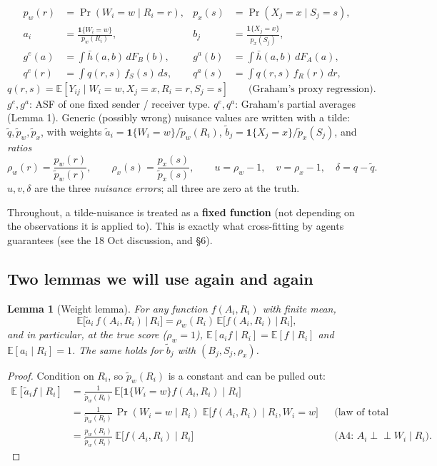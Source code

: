 \documentclass[11pt,a4paper]{article}
\newtheorem{lemma}{Lemma}
\theoremstyle{remark}
\newcommand{\E}{\mathbb{E}}
\newcommand{\1}{\mathbf{1}}
\newcommand{\ind}{\perp\!\!\!\perp}
\newcommand{\qe}{q^{e}}
\newcommand{\qa}{q^{a}}
\newcommand{\gE}{g^{e}}
\newcommand{\gA}{g^{a}}
\begin{document}
\begin{setupbox}
\begin{align*}
  p_w(r)&=\Pr(W_i=w\mid R_i=r), & p_x(s)&=\Pr(X_j=x\mid S_j=s), \\
  a_i&=\frac{\1\{W_i=w\}}{p_w(R_i)}, & b_j&=\frac{\1\{X_j=x\}}{p_x(S_j)},\\
  \gE(a)&=\int \bar h(a,b)\,dF_B(b), & \gA(b)&=\int \bar h(a,b)\,dF_A(a),\\
  \qe(r)&=\int q(r,s)\,f_S(s)\,ds, & \qa(s)&=\int q(r,s)\,f_R(r)\,dr,
\end{align*}
\[
q(r,s)=\E[Y_{ij}\mid W_i=w,X_j=x,R_i=r,S_j=s]\qquad\text{(Graham's proxy regression).}
\]
$\gE,\gA$: ASF of one fixed sender / receiver type. $\qe,\qa$: Graham's partial averages (Lemma 1).
Generic (possibly wrong) nuisance values are written with a tilde: $\tilde q,\tilde p_w,\tilde p_x$, with weights
$\tilde a_i=\1\{W_i=w\}/\tilde p_w(R_i)$, $\tilde b_j=\1\{X_j=x\}/\tilde p_x(S_j)$, and \emph{ratios}
\[
\rho_w(r)=\frac{p_w(r)}{\tilde p_w(r)},\qquad \rho_x(s)=\frac{p_x(s)}{\tilde p_x(s)},\qquad
u=\rho_w-1,\quad v=\rho_x-1,\quad \delta=q-\tilde q .
\]
$u,v,\delta$ are the three \emph{nuisance errors}; all three are zero at the truth.
\end{setupbox}

\noindent Throughout, a tilde-nuisance is treated as a \textbf{fixed function} (not depending on the observations it is applied to). This is exactly what cross-fitting by agents guarantees (see the 18 Oct discussion, and \S6).

\subsection*{Two lemmas we will use again and again}

\begin{lemma}[Weight lemma]\label{lem:weight}
For any function $f(A_i,R_i)$ with finite mean,
\[
\E\big[\tilde a_i\, f(A_i,R_i)\,\big|\,R_i\big]=\rho_w(R_i)\,\E\big[f(A_i,R_i)\,\big|\,R_i\big],
\]
and in particular, at the true score ($\rho_w=1$), $\E[a_i f\mid R_i]=\E[f\mid R_i]$ and $\E[a_i\mid R_i]=1$. The same holds for $\tilde b_j$ with $(B_j,S_j,\rho_x)$.
\end{lemma}

\begin{proof}
Condition on $R_i$, so $\tilde p_w(R_i)$ is a constant and can be pulled out:
\begin{align*}
\E[\tilde a_i f\mid R_i]
 &=\frac{1}{\tilde p_w(R_i)}\,\E\big[\1\{W_i=w\} f(A_i,R_i)\mid R_i\big] \\
 &=\frac{1}{\tilde p_w(R_i)}\,\Pr(W_i=w\mid R_i)\;\E\big[f(A_i,R_i)\mid R_i,W_i=w\big]
 &&\text{(law of total expectation)}\\
 &=\frac{p_w(R_i)}{\tilde p_w(R_i)}\;\E\big[f(A_i,R_i)\mid R_i\big]
 &&\text{(A4: } A_i\ind W_i\mid R_i).
\end{align*}
\end{proof}
\end{document}
